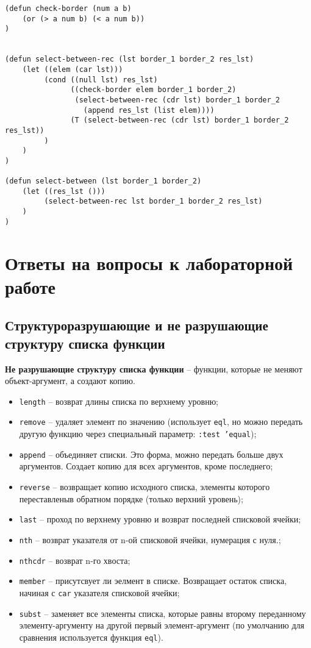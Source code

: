 \begin{lstlisting}
(defun check-border (num a b)
    (or (> a num b) (< a num b))
)


(defun select-between-rec (lst border_1 border_2 res_lst)
    (let ((elem (car lst)))
         (cond ((null lst) res_lst)
               ((check-border elem border_1 border_2) 
                (select-between-rec (cdr lst) border_1 border_2 
                  (append res_lst (list elem))))
               (T (select-between-rec (cdr lst) border_1 border_2 res_lst))
         )
    )
)

(defun select-between (lst border_1 border_2)
    (let ((res_lst ()))
         (select-between-rec lst border_1 border_2 res_lst)
    )
)
\end{lstlisting}




\chapter{Ответы на вопросы к лабораторной работе}

\section{Структуроразрушающие и не разрушающие структуру списка функции}

\textbf{Не разрушающие структуру списка функции} -- функции, которые не меняют объект-аргумент, а создают копию.

\begin{itemize}
    \item \texttt{length} -- возврат длины списка по верхнему уровню;
    \item \texttt{remove} -- удаляет элемент по значению (использует \texttt{eql}, но можно передать другую функцию через специальный параметр: \texttt{:test 'equal});
    \item \texttt{append} -- объединяет списки. Это форма, можно передать больше двух аргументов. Создает копию для всех аргументов, кроме последнего;
    \item \texttt{reverse} -- возвращает копию исходного списка, элементы которого переставленыв обратном порядке (только верхний уровень);
    \item \texttt{last} -- проход по верхнему уровню и возврат последней списковой ячейки;
    \item \texttt{nth} -- возврат указателя от n-ой списковой ячейки, нумерация с нуля.;
    \item \texttt{nthcdr} -- возврат n-го хвоста;
    \item \texttt{member} -- присутсвует ли эелмент в списке. Возвращает остаток списка, начиная с \texttt{car} указателя списковой ячейки;
    \item \texttt{subst} -- заменяет все элементы списка, которые равны второму переданному элементу-аргументу на другой первый элемент-аргумент (по умолчанию для сравнения используется функция \texttt{eql}).
\end{itemize}


